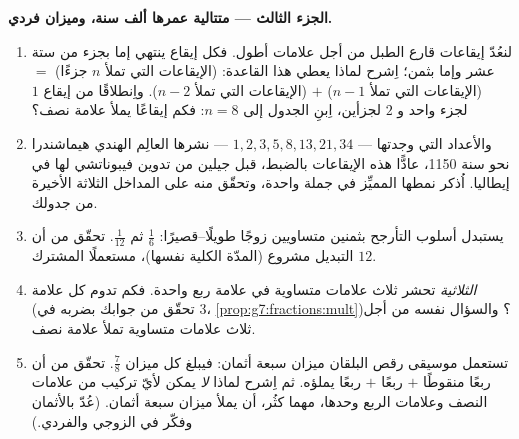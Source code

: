 \begin{problem}
\medskip
\noindent\textbf{الجزء الثالث --- متتالية عمرها ألف سنة،
وميزان فردي.}
\begin{enumerate}[resume]
  \item لنعُدّ إيقاعات قارع الطبل من أجل علامات أطول.
        فكل إيقاع ينتهي إما بجزء من ستة عشر وإما
        بثمن؛ اِشرح لماذا يعطي هذا القاعدة: (الإيقاعات
        التي تملأ $n$ جزءًا) $=$ (الإيقاعات التي تملأ $n - 1$)
        $+$ (الإيقاعات التي تملأ $n - 2$). واِنطلاقًا من إيقاع $1$
        لجزء واحد و $2$ لجزأين، اِبنِ الجدول إلى
        $n = 8$: فكم إيقاعًا يملأ علامة نصف؟
  \item والأعداد التي وجدتها --- $1, 2, 3, 5, 8, 13, 21, 34$
        --- نشرها العالِم الهندي هيماشندرا
        نحو سنة 1150، عادًّا هذه الإيقاعات بالضبط، قبل
        جيلين من تدوين فيبوناتشي لها في إيطاليا.
        اُذكر نمطها المميِّز في جملة واحدة، وتحقّق
        منه على المداخل الثلاثة الأخيرة من جدولك.
  \item يستبدل أسلوب التأرجح بثمنين متساويين زوجًا
        طويلًا--قصيرًا: $\frac16$ ثم $\frac{1}{12}$. تحقّق
        من أن التبديل مشروع (المدّة الكلية نفسها)، مستعملًا
         المشترك $12$.
  \item \emph{الثلاثية} تحشر ثلاث علامات متساوية في علامة
        ربع واحدة. فكم تدوم كل علامة (تحقّق من جوابك
        بضربه في $3$،
        \cref{prop:g7:fractions:mult})؟ والسؤال نفسه من أجل ثلاث
        علامات متساوية تملأ علامة نصف.
  \item تستعمل موسيقى رقص البلقان ميزان سبعة أثمان: فيبلغ كل ميزان
        $\frac78$. تحقّق من أن ربعًا منقوطًا $+$ ربعًا
        $+$ ربعًا يملؤه. ثم اِشرح لماذا \emph{لا}
        يمكن لأيّ تركيب من علامات النصف وعلامات الربع وحدها،
        مهما كثُر، أن يملأ ميزان سبعة أثمان.
        (عُدّ بالأثمان وفكّر في الزوجي والفردي.)
\end{enumerate}
\end{problem}
